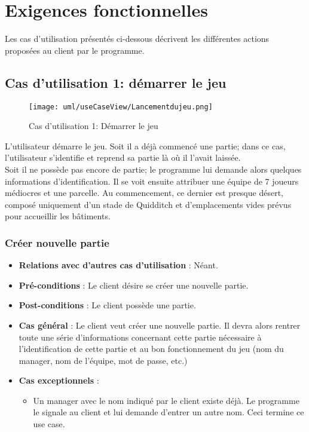 \documentclass[a4paper,titlepage]{scrreprt}
\begin{document}
\section{Exigences fonctionnelles}
  
  Les cas d'utilisation présentés ci-dessous décrivent les différentes actions proposées au client par le programme.

  \subsection{Cas d'utilisation 1: démarrer le jeu}
  \begin{figure}[H]
    \center
    \texttt{[image: uml/useCaseView/Lancementdujeu.png]}
    \caption{Cas d'utilisation 1: Démarrer le jeu}
  \end{figure}	
    L'utilisateur démarre le jeu. Soit il a déjà commencé une \gls{partie}; dans ce cas, l'utilisateur s'identifie et reprend sa partie là où il l'avait laissée. \\
    Soit il ne possède pas encore de partie; le programme lui demande alors quelques informations d'identification. 
    Il se voit ensuite attribuer une équipe de 7 \gls{joueur}s médiocres et une \gls{parcelle}. 
    Au commencement, ce dernier est presque désert, composé uniquement d'un 
    \gls{stade} de \gls{Quidditch} et d'emplacements vides prévus pour accueillir les bâtiments.
    \subsubsection{Créer nouvelle partie}
      \begin{itemize}
        \item \textbf{Relations avec d'autres cas d'utilisation}  : Néant.
        \item \textbf{Pré-conditions} : Le client désire se créer une nouvelle partie.
        \item \textbf{Post-conditions} : Le client possède une partie.
        \item \textbf{Cas général} : Le client veut créer une nouvelle partie. Il devra alors rentrer toute une série d’informations concernant cette partie nécessaire à l’identification de cette partie et au bon fonctionnement du jeu (nom du manager, nom de l’équipe, mot de passe, etc.)
        \item \textbf{Cas exceptionnels} :
          \begin{itemize}
            \item Un manager avec le nom indiqué par le client existe déjà. Le programme le signale au client et lui demande d'entrer un autre nom. Ceci termine ce use case.
          \end{itemize}
      \end{itemize}
\end{document}
